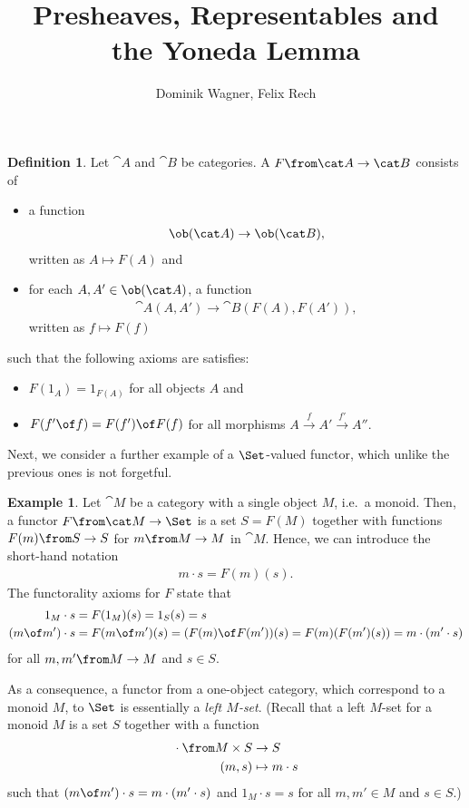 \documentclass{article}
\theoremstyle{definition}
\newtheorem{definition}{Definition}
\newtheorem{example}{Example}
\begin{document}
\title{Presheaves, Representables and\\the Yoneda Lemma}
\author{Dominik Wagner, Felix Rech}
\maketitle


\begin{definition}
  Let $\cat A$ and $\cat B$ be categories. A  $F \from \cat A\to\cat B$ consists of
    \begin{itemize}
    \item a function
      \begin{align*}
        \ob(\cat A)\to\ob(\cat B),
      \end{align*}
      written as $A\mapsto F(A)$ and
    \item for each $A,A'\in\ob(\cat A)$, a function
      \begin{align*}
        \cat A(A,A')\to\cat B(F(A),F(A')),
      \end{align*}
      written as $f\mapsto F(f)$
    \end{itemize}
    such that the following axioms are satisfies:
    \begin{itemize}
    \item $F(1_A)=1_{F(A)}$ for all objects $A$ and
    \item $F(f'\of f)=F(f')\of F(f)$ for all morphisms $A\xrightarrow{f}A'\xrightarrow{f'}A''$.
    \end{itemize}
\end{definition}

Next, we consider a further example of a $\Set$-valued functor, which unlike the previous ones is not forgetful.
\begin{example}
  \label{ex:Mset}
  Let $\cat M$ be a category with a single object $M$, i.e.\ a monoid. Then, a functor $F\from\cat M\to\Set$ is a set $S=F(M)$ together with functions $F(m)\from S\to S$ for $m\from M\to M$ in $\cat M$. Hence, we can introduce the short-hand notation
  \begin{align*}
    m\cdot s=F(m)(s).
  \end{align*}
  The functorality axioms for $F$ state that
  \begin{align*}
    1_M\cdot s&=F(1_M)(s)=1_S(s)=s\\
    (m\of m')\cdot s&=F(m\of m')(s)=(F(m)\of F(m'))(s)=F(m)(F(m')(s))=m\cdot (m'\cdot s)
  \end{align*}
  for all $m,m'\from M\to M$ and $s\in S$.

  As a consequence, a functor from a one-object category, which correspond to a monoid $M$, to $\Set$ is essentially a \emph{left $M$-set}. (Recall that a left $M$-set for a monoid $M$ is a set $S$ together with a function
  \begin{align*}
    {} \cdot {} \from M\times S&\to S\\
    (m,s)&\mapsto m\cdot s
  \end{align*}
  such that $(m\of m')\cdot s=m\cdot (m'\cdot s)$ and $1_M\cdot s=s$ for all $m,m'\in M$ and $s\in S$.)
\end{example}
\end{document}
